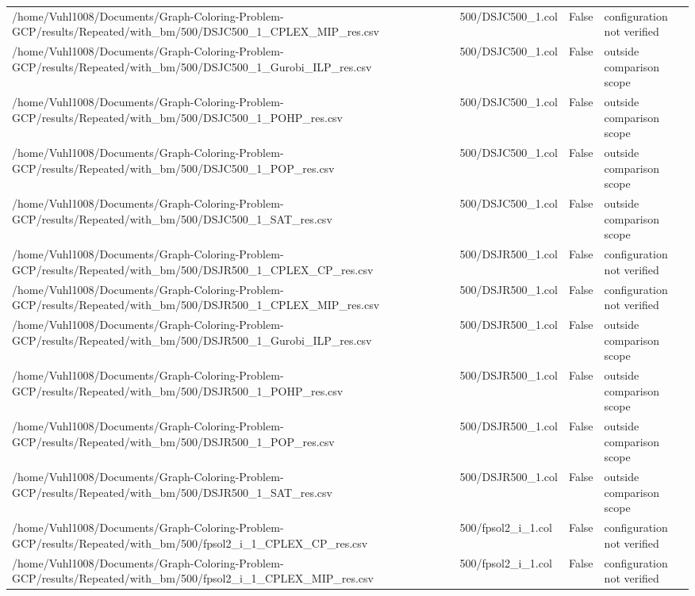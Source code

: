 \begin{table}[htbp]
\begin{tabular}{llll}
/home/Vuhl1008/Documents/Graph-Coloring-Problem-GCP/results/Repeated/with\_bm/500/DSJC500\_1\_CPLEX\_MIP\_res.csv & 500/DSJC500\_1.col & False & configuration not verified \\
/home/Vuhl1008/Documents/Graph-Coloring-Problem-GCP/results/Repeated/with\_bm/500/DSJC500\_1\_Gurobi\_ILP\_res.csv & 500/DSJC500\_1.col & False & outside comparison scope \\
/home/Vuhl1008/Documents/Graph-Coloring-Problem-GCP/results/Repeated/with\_bm/500/DSJC500\_1\_POHP\_res.csv & 500/DSJC500\_1.col & False & outside comparison scope \\
/home/Vuhl1008/Documents/Graph-Coloring-Problem-GCP/results/Repeated/with\_bm/500/DSJC500\_1\_POP\_res.csv & 500/DSJC500\_1.col & False & outside comparison scope \\
/home/Vuhl1008/Documents/Graph-Coloring-Problem-GCP/results/Repeated/with\_bm/500/DSJC500\_1\_SAT\_res.csv & 500/DSJC500\_1.col & False & outside comparison scope \\
/home/Vuhl1008/Documents/Graph-Coloring-Problem-GCP/results/Repeated/with\_bm/500/DSJR500\_1\_CPLEX\_CP\_res.csv & 500/DSJR500\_1.col & False & configuration not verified \\
/home/Vuhl1008/Documents/Graph-Coloring-Problem-GCP/results/Repeated/with\_bm/500/DSJR500\_1\_CPLEX\_MIP\_res.csv & 500/DSJR500\_1.col & False & configuration not verified \\
/home/Vuhl1008/Documents/Graph-Coloring-Problem-GCP/results/Repeated/with\_bm/500/DSJR500\_1\_Gurobi\_ILP\_res.csv & 500/DSJR500\_1.col & False & outside comparison scope \\
/home/Vuhl1008/Documents/Graph-Coloring-Problem-GCP/results/Repeated/with\_bm/500/DSJR500\_1\_POHP\_res.csv & 500/DSJR500\_1.col & False & outside comparison scope \\
/home/Vuhl1008/Documents/Graph-Coloring-Problem-GCP/results/Repeated/with\_bm/500/DSJR500\_1\_POP\_res.csv & 500/DSJR500\_1.col & False & outside comparison scope \\
/home/Vuhl1008/Documents/Graph-Coloring-Problem-GCP/results/Repeated/with\_bm/500/DSJR500\_1\_SAT\_res.csv & 500/DSJR500\_1.col & False & outside comparison scope \\
/home/Vuhl1008/Documents/Graph-Coloring-Problem-GCP/results/Repeated/with\_bm/500/fpsol2\_i\_1\_CPLEX\_CP\_res.csv & 500/fpsol2\_i\_1.col & False & configuration not verified \\
/home/Vuhl1008/Documents/Graph-Coloring-Problem-GCP/results/Repeated/with\_bm/500/fpsol2\_i\_1\_CPLEX\_MIP\_res.csv & 500/fpsol2\_i\_1.col & False & configuration not verified \\

\end{tabular}
\end{table}

